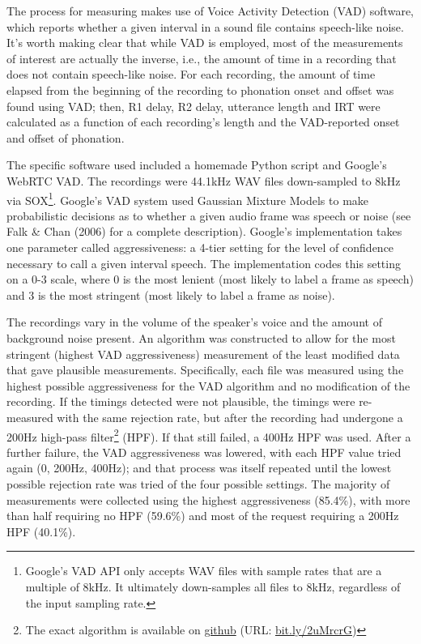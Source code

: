 \documentclass[12pt,oneside]{book}
\let\rmarkdownfootnote\footnote%
\def\footnote{\protect\rmarkdownfootnote}
\begin{document}
The process for measuring makes use of Voice Activity Detection (VAD) software, which reports whether a given interval in a sound file contains speech-like noise. It's worth making clear that while VAD is employed, most of the measurements of interest are actually the inverse, i.e., the amount of time in a recording that does not contain speech-like noise. For each recording, the amount of time elapsed from the beginning of the recording to phonation onset and offset was found using VAD; then, R1 delay, R2 delay, utterance length and IRT were calculated as a function of each recording's length and the VAD-reported onset and offset of phonation.

The specific software used included a homemade Python script and Google's WebRTC VAD. The recordings were 44.1kHz WAV files down-sampled to 8kHz via SOX\footnote{Google's VAD API only accepts WAV files with sample rates that are a multiple of 8kHz. It ultimately down-samples all files to 8kHz, regardless of the input sampling rate.}. Google's VAD system used Gaussian Mixture Models to make probabilistic decisions as to whether a given audio frame was speech or noise (see Falk \& Chan (2006) for a complete description). Google's implementation takes one parameter called aggressiveness: a 4-tier setting for the level of confidence necessary to call a given interval speech. The implementation codes this setting on a 0-3 scale, where 0 is the most lenient (most likely to label a frame as speech) and 3 is the most stringent (most likely to label a frame as noise).

The recordings vary in the volume of the speaker's voice and the amount of background noise present. An algorithm was constructed to allow for the most stringent (highest VAD aggressiveness) measurement of the least modified data that gave plausible measurements. Specifically, each file was measured using the highest possible aggressiveness for the VAD algorithm and no modification of the recording. If the timings detected were not plausible, the timings were re-measured with the same rejection rate, but after the recording had undergone a 200Hz high-pass filter\footnote{The exact algorithm is available on \href{https://gist.github.com/moui72/4ebc4eb8f69eb9fdb1cab160ce299675}{github} (URL: \href{https://bit.ly/2uMrcrG}{bit.ly/2uMrcrG})} (HPF). If that still failed, a 400Hz HPF was used. After a further failure, the VAD aggressiveness was lowered, with each HPF value tried again (0, 200Hz, 400Hz); and that process was itself repeated until the lowest possible rejection rate was tried of the four possible settings. The majority of measurements were collected using the highest aggressiveness (85.4\%), with more than half requiring no HPF (59.6\%) and most of the request requiring a 200Hz HPF (40.1\%).
\end{document}
